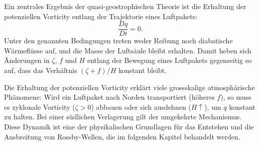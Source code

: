 Ein zentrales Ergebnis der quasi-geostrophischen Theorie ist die Erhaltung der
potenziellen Vorticity entlang der Trajektorie eines Luftpakets:
\begin{equation}
    \frac{Dq}{Dt} = 0.
    \label{rossby:eq:pv_conservation}
\end{equation}
Unter den genannten Bedingungen treten weder Reibung noch diabatische Wärmeflüsse auf, und die Masse der Luftsäule bleibt erhalten.
Damit heben sich Änderungen in \(\zeta\), \(f\) und \(H\) entlang der Bewegung eines Luftpakets gegenseitig so auf, dass das Verhältnis \((\zeta + f)/H\) konstant bleibt.

Die Erhaltung der potenziellen Vorticity erklärt viele grossskalige atmosphärische Phänomene: Wird ein Luftpaket nach Norden transportiert (höheres \(f\)), so muss es zyklonale
Vorticity (\(\zeta > 0\)) abbauen oder sich ausdehnen (\(H \uparrow\)), um
\(q\) konstant zu halten. Bei einer südlichen Verlagerung gilt der umgekehrte
Mechanismus. Diese Dynamik ist eine der physikalischen Grundlagen für das
Entstehen und die Ausbreitung von Rossby-Wellen, die im folgenden Kapitel
behandelt werden.
